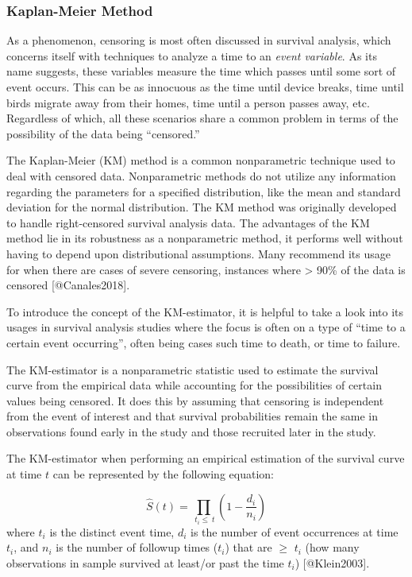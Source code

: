 \documentclass[
]{article}
\begin{document}
\hypertarget{rkm}{%
\subsubsection{Kaplan-Meier Method}\label{rkm}}

As a phenomenon, censoring is most often discussed in survival analysis,
which concerns itself with techniques to analyze a time to an
\emph{event variable}. As its name suggests, these variables measure the
time which passes until some sort of event occurs. This can be as
innocuous as the time until device breaks, time until birds migrate away
from their homes, time until a person passes away, etc. Regardless of
which, all these scenarios share a common problem in terms of the
possibility of the data being ``censored.''

The Kaplan-Meier (KM) method is a common nonparametric technique used to
deal with censored data. Nonparametric methods do not utilize any
information regarding the parameters for a specified distribution, like
the mean and standard deviation for the normal distribution. The KM
method was originally developed to handle right-censored survival
analysis data. The advantages of the KM method lie in its robustness as
a nonparametric method, it performs well without having to depend upon
distributional assumptions. Many recommend its usage for when there are
cases of severe censoring, instances where \textgreater{} 90\% of the
data is censored {[}@Canales2018{]}.

To introduce the concept of the KM-estimator, it is helpful to take a
look into its usages in survival analysis studies where the focus is
often on a type of ``time to a certain event occurring'', often being
cases such time to death, or time to failure.

The KM-estimator is a nonparametric statistic used to estimate the
survival curve from the empirical data while accounting for the
possibilities of certain values being censored. It does this by assuming
that censoring is independent from the event of interest and that
survival probabilities remain the same in observations found early in
the study and those recruited later in the study.

The KM-estimator when performing an empirical estimation of the survival
curve at time \(t\) can be represented by the following equation:

\[\hat{S}(t) = \prod_{\ t_i \le \ t }\left(1-\frac{d_i}{n_i}\right)\]
where \(t_i\) is the distinct event time, \(d_i\) is the number of event
occurrences at time \(t_i\), and \(n_i\) is the number of followup times
(\(t_i\)) that are \(\ge\) \(t_i\) (how many observations in sample
survived at least/or past the time \(t_i\)) {[}@Klein2003{]}.
\end{document}
